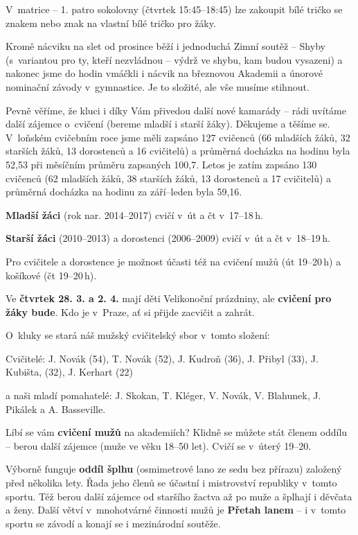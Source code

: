 \documentclass[11pt]{article}
\begin{document}
V~matrice – 1. patro sokolovny (čtvrtek 15:45–⁠⁠⁠⁠⁠18:45) lze zakoupit bílé tričko se znakem nebo znak na vlastní bílé tričko pro žáky.

Kromě nácviku na slet od prosince běží i jednoduchá Zimní soutěž – Shyby (s~variantou pro ty, kteří nezvládnou – výdrž ve shybu, kam budou vysazeni) a nakonec jsme do hodin vmáčkli i nácvik na březnovou Akademii a únorové nominační závody v~gymnastice. Je to složité, ale vše musíme stihnout.

Pevně věříme, že kluci i díky Vám přivedou další nové kamarády – rádi uvítáme další zájemce o~cvičení (bereme mladší i starší žáky). Děkujeme a těšíme se. V~loňském cvičebním roce jsme měli zapsáno 127 cvičenců (66 mladších žáků, 32 starších žáků, 13 dorostenců a 16 cvičitelů) a průměrná docházka na hodinu byla 52,53 při měsíčním průměru zapsaných 100,7. Letos je zatím zapsáno 130 cvičenců (62 mladších žáků, 38 starších žáků, 13 dorostenců a 17 cvičitelů) a průměrná docházka na hodinu za září–leden byla 59,16.

\textbf{Mladší žáci} (rok nar. 2014–2017) cvičí v~út a čt v~17–18\,h.

\noindent
\textbf{Starší žáci} (2010–2013) a dorostenci (2006–2009) cvičí v~út a čt v~18–19\,h.

Pro cvičitele a dorostence je možnost účasti též na cvičení mužů (út 19–20\,h) a košíkové (čt 19–20\,h).

Ve \textbf{čtvrtek 28. 3. a 2. 4.} mají děti Velikonoční prázdniny, ale \textbf{cvičení pro žáky bude}. Kdo je v~Praze, ať si přijde zacvičit a zahrát.

O~kluky se stará náš mužský cvičitelský sbor v~tomto složení:

\noindent
Cvičitelé: J. Novák (54), T. Novák (52), J. Kudroň (36), J. Přibyl (33), J. Kubišta, (32), J. Kerhart (22)

\noindent
a naši mladí pomahatelé: J. Skokan, T. Kléger, V. Novák, V. Blahunek, J. Pikálek a A. Basseville.

\signature{Jiří Novák (Jirkan)}{}

\vspace*{24pt}


Líbí se vám \textbf{cvičení mužů} na akademiích? Klidně se můžete stát členem oddílu – berou další zájemce (muže ve věku 18–⁠⁠⁠⁠⁠50 let). Cvičí se v~úterý 19–⁠⁠⁠⁠⁠20.

Výborně funguje \textbf{oddíl šplhu} (osmimetrové lano ze sedu bez přírazu) založený před několika lety. Řada jeho členů se účastní i mistrovství republiky v~tomto sportu. Též berou další zájemce od staršího žactva až po muže a šplhají i děvčata a ženy. Další větví v~mnohotvárné činnosti mužů je \textbf{Přetah lanem} – i v~tomto sportu se závodí a konají se i mezinárodní soutěže.
\end{document}
